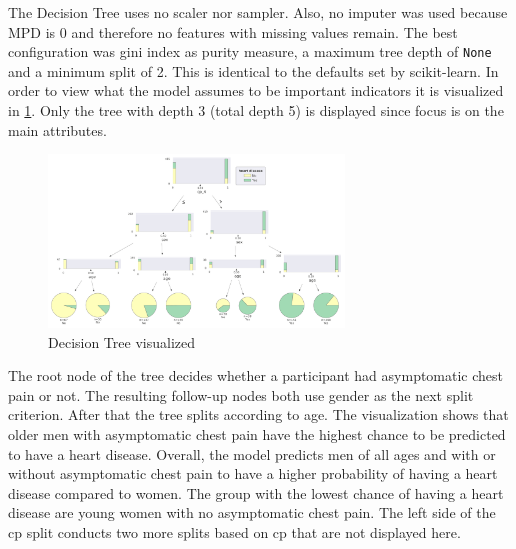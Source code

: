 The Decision Tree uses no scaler nor sampler. Also, no imputer was used because MPD is 0 and therefore no features with missing values remain. The best configuration was gini index as purity measure, a maximum tree depth of \texttt{None} and a minimum split of 2. This is identical to the defaults set by scikit-learn. 
In order to view what the model assumes to be important indicators it is visualized in \cref{fig:DecisionTree}. Only  the tree with depth 3 (total depth 5) is displayed since focus is on the main attributes. 
\begin{figure}[h]
	\centering
	\includegraphics[width=0.7\textwidth]{images/DecisionTree.png}
	\caption{Decision Tree visualized}
	\label{fig:DecisionTree}
\end{figure}

The root node of the tree decides whether a participant had asymptomatic chest pain or not. The resulting follow-up nodes both use gender as the next split criterion. After that the tree splits according to age. The visualization shows that older men with asymptomatic chest pain have the highest chance to be predicted to have a heart disease. Overall, the model predicts men of all ages and with or without asymptomatic chest pain to have a higher probability of having a heart disease compared to women. The group with the lowest chance of having a heart disease are young women with no asymptomatic chest pain. The left side of the cp split conducts two more splits based on cp that are not displayed here. 
